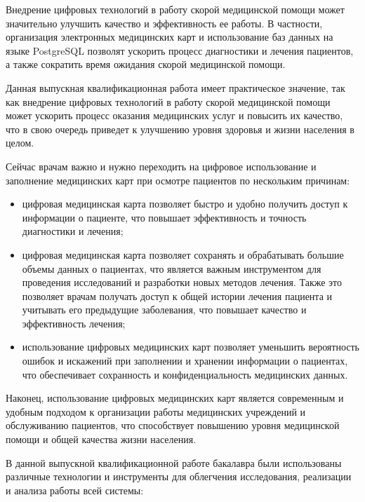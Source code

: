 Внедрение цифровых технологий в работу скорой медицинской помощи может значительно улучшить качество и эффективность ее работы. В частности, организация электронных медицинских карт и использование баз данных на языке PostgreSQL позволят ускорить процесс диагностики и лечения пациентов, а также сократить время ожидания скорой медицинской помощи.

Данная выпускная квалификационная работа имеет практическое значение, так как внедрение цифровых технологий в работу скорой медицинской помощи может ускорить процесс оказания медицинских услуг и повысить их качество, что в свою очередь приведет к улучшению уровня здоровья и жизни населения в целом.

Сейчас врачам важно и нужно переходить на цифровое использование и заполнение медицинских карт при осмотре пациентов по нескольким причинам:

\begin{itemize}
    \item цифровая медицинская карта позволяет быстро и удобно получить доступ к информации о пациенте, что повышает эффективность и точность диагностики и лечения;
    \item цифровая медицинская карта позволяет сохранять и обрабатывать большие объемы данных о пациентах, что является важным инструментом для проведения исследований и разработки новых методов лечения. Также это позволяет врачам получать доступ к общей истории лечения пациента и учитывать его предыдущие заболевания, что повышает качество и эффективность лечения;
    \item использование цифровых медицинских карт позволяет уменьшить вероятность ошибок и искажений при заполнении и хранении информации о пациентах, что обеспечивает сохранность и конфиденциальность медицинских данных.
\end{itemize}

Наконец, использование цифровых медицинских карт является современным и удобным подходом к организации работы медицинских учреждений и обслуживанию пациентов, что способствует повышению уровня медицинской помощи и общей качества жизни населения.

В данной выпускной квалификационной работе бакалавра были использованы различные технологии и инструменты для облегчения исследования, реализации и анализа работы всей системы:

